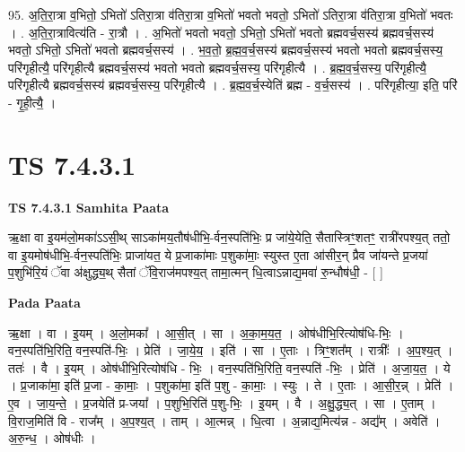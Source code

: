 \documentclass[17pt]{extarticle}
\begin{document}
95. अ॒ति॒रा॒त्रा व॒भितो॒ ऽभितो॑ ऽतिरा॒त्रा व॑तिरा॒त्रा व॒भितो॑ भवतो भवतो॒ ऽभितो॑ ऽतिरा॒त्रा व॑तिरा॒त्रा व॒भितो॑ भवतः । . अ॒ति॒रा॒त्रावित्य॑ति - रा॒त्रौ । . अ॒भितो॑ भवतो भवतो॒ ऽभितो॒ ऽभितो॑ भवतो ब्रह्मवर्च॒सस्य॑ ब्रह्मवर्च॒सस्य॑ भवतो॒ ऽभितो॒ ऽभितो॑ भवतो ब्रह्मवर्च॒सस्य॑ । . भ॒व॒तो॒ ब्र॒ह्म॒व॒र्च॒सस्य॑ ब्रह्मवर्च॒सस्य॑ भवतो भवतो ब्रह्मवर्च॒सस्य॒ परि॑गृहीत्यै॒ परि॑गृहीत्यै ब्रह्मवर्च॒सस्य॑ भवतो भवतो ब्रह्मवर्च॒सस्य॒ परि॑गृहीत्यै । . ब्र॒ह्म॒व॒र्च॒सस्य॒ परि॑गृहीत्यै॒ परि॑गृहीत्यै ब्रह्मवर्च॒सस्य॑ ब्रह्मवर्च॒सस्य॒ परि॑गृहीत्यै । . ब्र॒ह्म॒व॒र्च॒स्येति॑ ब्रह्म - व॒र्च॒सस्य॑ । . परि॑गृहीत्या॒ इति॒ परि॑ - गृ॒ही॒त्यै॒ । \newline
\pagebreak
{}

\section{ TS 7.4.3.1 }

\textbf{TS 7.4.3.1 } \newline
\textbf{Samhita Paata} \newline

ऋ॒क्षा वा इ॒यम॑लो॒मका॑ऽऽसी॒थ् साऽका॑मय॒तौष॑धीभि॒-र्वन॒स्पति॑भिः॒ प्र जा॑ये॒येति॒ सैतास्त्रिꣳ॒॒शतꣳ॒॒ रात्री॑रपश्य॒त् ततो॒ वा इ॒यमोष॑धीभि॒-र्वन॒स्पति॑भिः॒ प्राजा॑यत॒ ये प्र॒जाका॑माः प॒शुका॑माः॒ स्युस्त ए॒ता आ॑सीर॒न् प्रैव जा॑यन्ते प्र॒जया॑ प॒शुभि॑रि॒यं ॅवा अ॑क्षुद्ध्य॒थ् सैतां ॅवि॒राज॑मपश्य॒त् तामा॒त्मन् धि॒त्वाऽन्नाद्य॒मवा॑ रु॒न्धौष॑धी॒ - [  ] \newline

\textbf{Pada Paata} \newline

ऋ॒क्षा । वा । इ॒यम् । अ॒लो॒मका᳚ । आ॒सी॒त् । सा । अ॒का॒म॒य॒त॒ । ओष॑धीभि॒रित्योष॑धि-भिः॒ । वन॒स्पति॑भि॒रिति॒ वन॒स्पति॑-भिः॒ । प्रेति॑ । जा॒ये॒य॒ । इति॑ । सा । ए॒ताः । त्रिꣳ॒॒शत᳚म् । रात्रीः᳚ । अ॒प॒श्य॒त् । ततः॑ । वै । इ॒यम् । ओष॑धीभि॒रित्योष॑धि - भिः॒ । वन॒स्पति॑भि॒रिति॒ वन॒स्पति॑ -भिः॒ । प्रेति॑ । अ॒जा॒य॒त॒ । ये । प्र॒जाका॑मा॒ इति॑ प्र॒जा - का॒माः॒ । प॒शुका॑मा॒ इति॑ प॒शु - का॒माः॒ । स्युः । ते । ए॒ताः । आ॒सी॒र॒न्न् । प्रेति॑ । ए॒व । जा॒य॒न्ते॒ । प्र॒जयेति॑ प्र-जया᳚ । प॒शुभि॒रिति॑ प॒शु-भिः॒ । इ॒यम् । वै । अ॒क्षु॒द्ध्य॒त् । सा । ए॒ताम् । वि॒राज॒मिति॑ वि - राज᳚म् । अ॒प॒श्य॒त् । ताम् । आ॒त्मन्न् । धि॒त्वा । अ॒न्नाद्य॒मित्य॑न्न - अद्य᳚म् । अवेति॑ । अ॒रु॒न्ध॒ । ओष॑धीः ।  \newline
\end{document}
